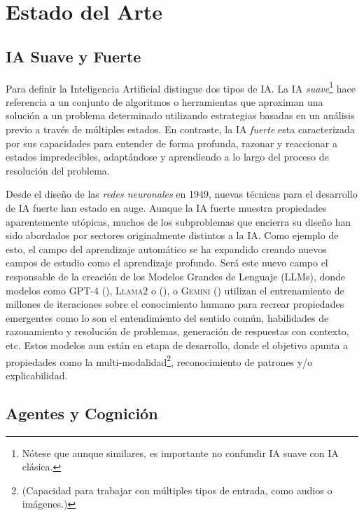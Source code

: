 \chapter{Estado del Arte}
\section{IA Suave y Fuerte}

Para definir la Inteligencia Artificial \citet{searle1980minds} distingue dos
tipos de IA. La IA \emph{suave}\footnote{Nótese que aunque similares, es
importante no confundir IA suave con IA clásica.} hace referencia a un conjunto
de algoritmos o herramientas que aproximan una solución a un problema
determinado utilizando estrategias basadas en un análisis previo a través de
múltiples estados. En contraste, la IA \emph{fuerte} esta caracterizada por
sus capacidades para entender de forma profunda, razonar y reaccionar a estados
impredecibles, adaptándose y aprendiendo a lo largo del proceso de resolución
del problema. 

Desde el diseño de las \emph{redes neuronales} en 1949, nuevas técnicas para el 
desarrollo de IA fuerte han estado en auge. Aunque la IA fuerte muestra
propiedades aparentemente utópicas, muchos de los subproblemas que encierra su
diseño han sido abordados por sectores originalmente distintos a la IA. Como ejemplo de esto,
el campo del aprendizaje automático se ha expandido creando nuevos campos de
estudio como el aprendizaje profundo. Será este nuevo campo el responsable de
la creación de los Modelos Grandes de Lenguaje (LLMs), donde modelos como
\textsc{GPT-4} (\citet{achiam2023gpt}), \textsc{Llama2} o
(\citet{touvron2023llama}), o \textsc{Gemini} (\citet{saeidnia2023welcome}) utilizan
el entrenamiento de millones de iteraciones sobre el conocimiento humano para recrear
propiedades emergentes como lo son el entendimiento del sentido común, habilidades
de razonamiento y resolución de problemas, generación de respuestas con contexto, etc.
Estos modelos aun están en etapa de desarrollo, donde el objetivo apunta a
propiedades como la multi-modalidad\footnote{(Capacidad para trabajar con
múltiples tipos de entrada, como audios o imágenes.)}, reconocimiento de
patrones y/o explicabilidad.

\section{Agentes y Cognición}
\label{sec:agents_and_cognition}

